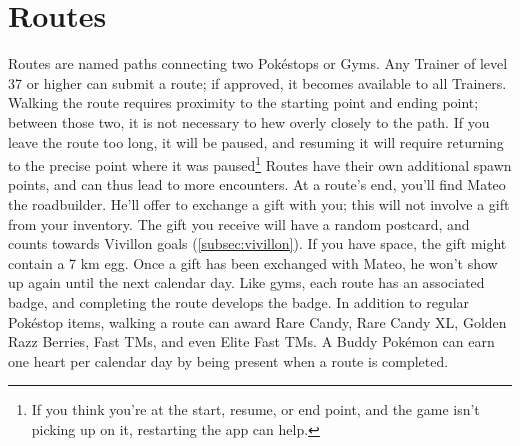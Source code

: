 \section{Routes}
Routes are named paths connecting two Pokéstops or Gyms.
Any Trainer of level 37 or higher can submit a route; if approved, it becomes available to all Trainers.
Walking the route requires proximity to the starting point and ending point; between those two,
 it is not necessary to hew overly closely to the path.
If you leave the route too long, it will be paused, and resuming it will require returning to the precise
 point where it was paused\footnote{If you think you're at the start, resume, or end point, and the game isn't picking
 up on it, restarting the app can help.}
Routes have their own additional spawn points, and can thus lead to more encounters.
At a route's end, you'll find Mateo the roadbuilder.
He'll offer to exchange a gift with you; this will not involve a gift from your inventory.
The gift you receive will have a random postcard, and counts towards Vivillon goals (\autoref{subsec:vivillon}).
If you have space, the gift might contain a 7 km egg.
Once a gift has been exchanged with Mateo, he won't show up again until the next calendar day.
Like gyms, each route has an associated badge, and completing the route develops the badge.
In addition to regular Pokéstop items, walking a route can award Rare Candy, Rare Candy XL,
 Golden Razz Berries, Fast TMs, and even Elite Fast TMs.
A Buddy Pokémon can earn one heart per calendar day by being present when a route is completed.
